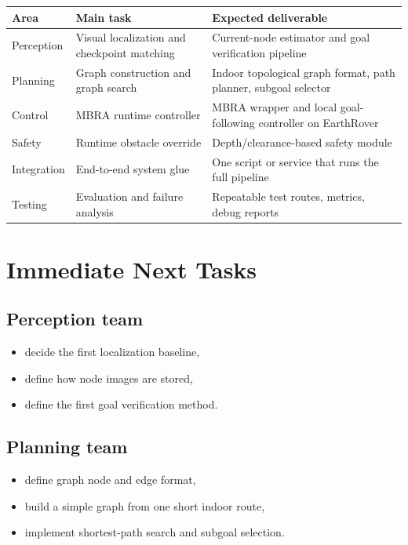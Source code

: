 \documentclass[11pt,a4paper]{article}
\begin{document}
\begin{tabularx}{\textwidth}{p{} p{} X}
\toprule
\textbf{Area} & \textbf{Main task} & \textbf{Expected deliverable} \\
\midrule
Perception & Visual localization and checkpoint matching & Current-node estimator and goal verification pipeline \\
Planning & Graph construction and graph search & Indoor topological graph format, path planner, subgoal selector \\
Control & MBRA runtime controller & MBRA wrapper and local goal-following controller on EarthRover \\
Safety & Runtime obstacle override & Depth/clearance-based safety module \\
Integration & End-to-end system glue & One script or service that runs the full pipeline \\
Testing & Evaluation and failure analysis & Repeatable test routes, metrics, debug reports \\
\bottomrule
\end{tabularx}


\section{Immediate Next Tasks}

\subsection*{Perception team}
\begin{itemize}[nosep]
  \item decide the first localization baseline,
  \item define how node images are stored,
  \item define the first goal verification method.
\end{itemize}

\subsection*{Planning team}
\begin{itemize}[nosep]
  \item define graph node and edge format,
  \item build a simple graph from one short indoor route,
  \item implement shortest-path search and subgoal selection.
\end{itemize}
\end{document}
